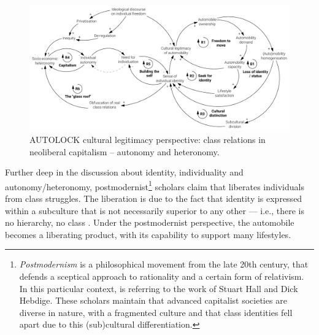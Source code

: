 \begin{figure}
\includegraphics[width=1.2\textwidth,center]{figures/model/cropped/cultural_3_final.pdf}
\caption[AUTOLOCK cultural legitimacy perspective: class relations.]{AUTOLOCK cultural legitimacy perspective: class relations in neoliberal capitalism -- autonomy and heteronomy.}
\label{f:results:cld_culture_3}
\end{figure}

Further deep in the discussion about identity, individuality and autonomy/heteronomy, postmodernist\footnote{\emph{Postmodernism} is a philosophical movement from the late 20th century, that defends a sceptical approach to rationality and a certain form of relativism. In this particular context, \textcite{gartman2004_ThreeAgesAutomobile} is referring to the work of Stuart Hall and Dick Hebdige. These scholars maintain that advanced capitalist societies are diverse in nature, with a fragmented culture and that class identities fell apart due to this (sub)cultural differentiation.} scholars claim that  liberates individuals from class struggles. The liberation is due to the fact that identity is expressed within a subculture that is not necessarily superior to any other --- i.e., there is no hierarchy, no class \parencite{gartman2004_ThreeAgesAutomobile}. Under the postmodernist perspective, the automobile becomes a liberating product, with its capability to support many lifestyles.

